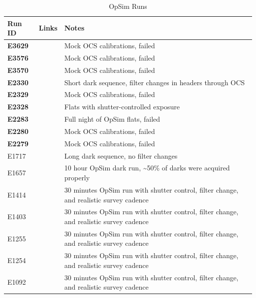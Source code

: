 \begin{table}[H]\label{table:runs_opSim}
\centering
\caption{OpSim Runs}
\begin{tabular}{|p{1.5cm}|p{2.9cm}|p{9cm}|}
\hline
Run ID & Links & Notes \\ \hline


\textbf{E3629} & & Mock OCS calibrations, failed\\ \hline 
\textbf{E3576} & & Mock OCS calibrations, failed\\ \hline 
\textbf{E3570} & & Mock OCS calibrations, failed\\ \hline 
\textbf{E2330} & & Short dark sequence, filter changes in headers through OCS \\ \hline
\textbf{E2329} & & Mock OCS calibrations, failed\\ \hline 
\textbf{E2328} & & Flats with shutter-controlled exposure \\ \hline
\textbf{E2283} & & Full night of OpSim flats, failed \\ \hline
\textbf{E2280} & & Mock OCS calibrations, failed\\ \hline 
\textbf{E2279} & & Mock OCS calibrations, failed\\ \hline 
E1717 & & Long dark sequence, no filter changes \\ \hline
E1657 & & 10 hour OpSim dark run, \textasciitilde50\% of darks were acquired properly \\ \hline
E1414 & & 30 minutes OpSim run with shutter control, filter change, and realistic survey cadence \\ \hline
E1403 & & 30 minutes OpSim run with shutter control, filter change, and realistic survey cadence \\ \hline
E1255 & & 30 minutes OpSim run with shutter control, filter change, and realistic survey cadence \\ \hline
E1254 & & 30 minutes OpSim run with shutter control, filter change, and realistic survey cadence \\ \hline
E1092 & & 30 minutes OpSim run with shutter control, filter change, and realistic survey cadence \\ \hline

\end{tabular}
\end{table}


